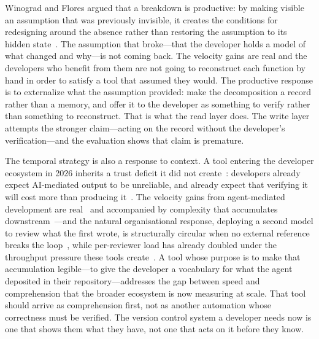 Winograd and Flores argued that a breakdown is productive: by making visible an
assumption that was previously invisible, it creates the conditions for
redesigning around the absence rather than restoring the assumption to its hidden
state~\cite{winograd1986}. The assumption that broke---that the developer holds a
model of what changed and why---is not coming back. The velocity gains are real
and the developers who benefit from them are not going to reconstruct each
function by hand in order to satisfy a tool that assumed they would. The
productive response is to externalize what the assumption provided: make the
decomposition a record rather than a memory, and offer it to the developer as
something to verify rather than something to reconstruct. That is what the read
layer does. The write layer attempts the stronger claim---acting on the record
without the developer's verification---and the evaluation shows that claim is
premature.

The temporal strategy is also a response to context. A tool entering the
developer ecosystem in 2026 inherits a trust deficit it did not
create~\cite{stackoverflow2025}: developers already expect AI-mediated output to
be unreliable, and already expect that verifying it will cost more than
producing it~\cite{mozannar2024}. The velocity gains from agent-mediated
development are real~\cite{murphyhill2026,cui2025} and accompanied by
complexity that accumulates downstream~\cite{he2026}---and the natural
organisational response, deploying a second model to review what the first wrote,
is structurally circular when no external reference breaks the
loop~\cite{zietsman2026}, while per-reviewer load has already doubled under the
throughput pressure these tools create~\cite{he2026review}. A tool whose purpose
is to make that accumulation legible---to give the developer a vocabulary for
what the agent deposited in their repository---addresses the gap between speed
and comprehension that the broader ecosystem is now measuring at scale. That tool
should arrive as comprehension first, not as another automation whose correctness
must be verified. The version control system a developer needs now is one that
shows them what they have, not one that acts on it before they know.
